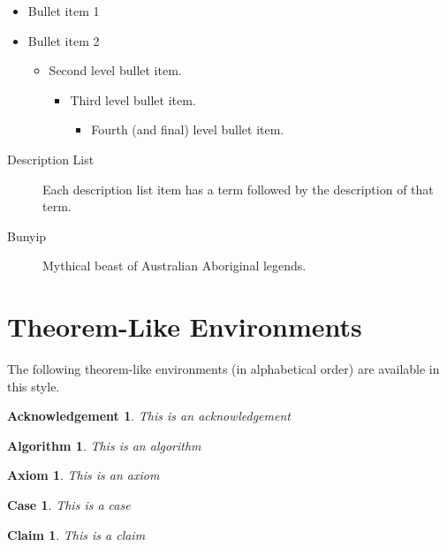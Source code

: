 \documentclass{report}%
\newtheorem{acknowledgement}[theorem]{Acknowledgement}
\newtheorem{algorithm}[theorem]{Algorithm}
\newtheorem{axiom}[theorem]{Axiom}
\newtheorem{case}[theorem]{Case}
\newtheorem{claim}[theorem]{Claim}
\begin{document}
\begin{itemize}
\item Bullet item 1

\item Bullet item 2

\begin{itemize}
\item Second level bullet item.

\begin{itemize}
\item Third level bullet item.

\begin{itemize}
\item Fourth (and final) level bullet item.
\end{itemize}
\end{itemize}
\end{itemize}
\end{itemize}

\begin{description}
\item[Description List] Each description list item has a term
followed by the description of that term.

\item[Bunyip] Mythical beast of Australian Aboriginal legends.
\end{description}

\section{Theorem-Like Environments}

The following theorem-like environments (in alphabetical order) are available
in this style.

\begin{acknowledgement}
This is an acknowledgement
\end{acknowledgement}

\begin{algorithm}
This is an algorithm
\end{algorithm}

\begin{axiom}
This is an axiom
\end{axiom}

\begin{case}
This is a case
\end{case}

\begin{claim}
This is a claim
\end{claim}
\end{document}
